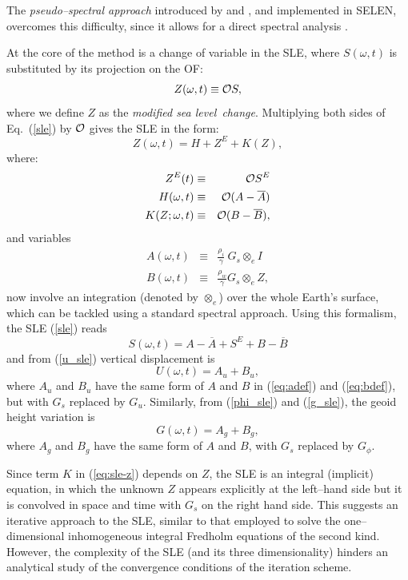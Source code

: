 \documentclass[11pt,fleqn,a4paper,titlepage]{article}
\newcommand\selens{\textsf{SELEN}}
\newcommand\sealevel{sea level~}
\begin{document}
The \emph{pseudo--spectral approach} introduced {by \citet{Mitrovica_and_Peltier_1991} 
and}  \citet{Mitrovica_etal_1994}, and implemented in \selens, overcomes this difficulty, since 
it allows for a direct spectral analysis \citep{Milne_1998}. {At the core of the 
method is a change of variable in the SLE, where $S(\omega,t)$ is substituted by its projection on the OF:
\begin{equation}
Z(\omega,t) \equiv {\cal O}S,
\end{equation}
where we define $Z$ as the \emph{modified \sealevel change}. Multiplying both sides of 
Eq.~(\ref{sle}) by ${\cal O}$ gives the SLE in the form:
\begin{equation}\label{eq:sle-z}
Z(\omega,t) = H  + Z^E + K(Z), 
\end{equation}
where: 
\begin{eqnarray}
Z^E(t)      & \equiv & {\cal O}S^E \\
H(\omega,t) & \equiv &{\cal O}(A - \overline{A}) \\
K(Z;\omega,t) & \equiv & {\cal O}(B - \overline{B}), 
\end{eqnarray}
and variables 
\begin{eqnarray}
A(\omega,t) &\equiv & \frac{\rho_i}{\gamma}~ G_s {\otimes}_e I \label{eq:adef}\\
B(\omega,t) &\equiv & \frac{\rho_w}{\gamma}  G_s {\otimes}_e Z \label{eq:bdef},
\end{eqnarray}
now involve an integration (denoted by ${\otimes}_e$) over the whole Earth's surface, which can
be tackled using a standard spectral approach. Using this formalism, the SLE (\ref{sle}) reads 
\begin{equation}\label{eq:sle-ab}
S(\omega,t) = A - \overline{A} + S^E + B - \overline{B}  
\end{equation}
and from (\ref{u_sle}) vertical displacement is  
\begin{equation}\label{u-ab}
U(\omega,t) = A_u + B_u,
\end{equation}
where $A_u$ and $B_u$ have the same form of $A$ and $B$ in (\ref{eq:adef}) and (\ref{eq:bdef}), but with $G_s$ replaced by $G_u$. 
Similarly, from (\ref{phi_sle}) and (\ref{g_sle}), the geoid height variation is  
\begin{equation}\label{g-ab}
G(\omega,t) = A_g + B_g,
\end{equation}
where $A_g$ and $B_g$ have the same form of $A$ and $B$, with $G_s$ replaced by $G_\phi$.

Since term $K$ in (\ref{eq:sle-z}) depends on $Z$, the SLE is an integral (implicit) equation, in which the unknown $Z$ appears explicitly at the left--hand side but it is convolved in space and time with $G_s$ on the right hand side. This suggests an iterative approach to the SLE, similar to that employed to solve the one--dimensional inhomogeneous integral Fredholm equations of the second kind. However, the complexity of the SLE (and its three dimensionality) hinders an analytical study of the convergence conditions of the iteration scheme. 

}
\end{document}
